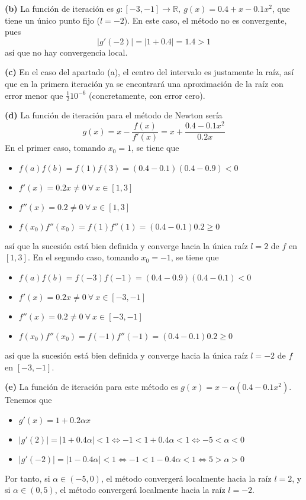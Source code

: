 \documentclass[12pt]{report}
\newcommand{\R}{\mathbb R}
\begin{document}
\vspace{2mm}
\textbf{(b) } La función de iteración es $g \colon [-3,-1] \to \R, \ g(x) = 0.4 + x - 0.1x^2$, que tiene un único punto fijo ($l = -2$). En este caso, el método no es convergente, pues
\[|g'(-2)| = |1+0.4| = 1.4 > 1\]
así que no hay convergencia local.

\vspace{2mm}
\textbf{(c) } En el caso del apartado (a), el centro del intervalo es justamente la raíz, así que en la primera iteración ya se encontrará una aproximación de la raíz con error menor que $\frac{1}{2}10^{-6}$ (concretamente, con error cero).

\vspace{2mm}
\textbf{(d) } La función de iteración para el método de Newton sería
\[g(x) = x - \frac{f(x)}{f'(x)} = x + \frac{0.4-0.1x^2}{0.2x}\]
En el primer caso, tomando $x_0 = 1$, se tiene que
\begin{itemize}
    \item $f(a)f(b) = f(1)f(3) = (0.4-0.1)(0.4-0.9) < 0$
    \item $f'(x) = 0.2x \neq 0 \ \forall \ x \in [1,3]$
    \item $f''(x) = 0.2 \neq 0 \ \forall \ x \in [1,3]$
    \item $f(x_0)f''(x_0) = f(1)f''(1) = (0.4-0.1)0.2 \geq 0$
\end{itemize}
así que la sucesión está bien definida y converge hacia la única raíz $l = 2$ de $f$ en $[1,3]$. En el segundo caso, tomando $x_0 = -1$, se tiene que
\begin{itemize}
    \item $f(a)f(b) = f(-3)f(-1) = (0.4-0.9)(0.4-0.1) < 0$
    \item $f'(x) = 0.2x \neq 0 \ \forall \ x \in [-3,-1]$
    \item $f''(x) = 0.2 \neq 0 \ \forall \ x \in [-3,-1]$
    \item $f(x_0)f''(x_0) = f(-1)f''(-1) = (0.4-0.1)0.2 \geq 0$
\end{itemize}
así que la sucesión está bien definida y converge hacia la única raíz $l = -2$ de $f$ en $[-3,-1]$.

\vspace{2mm}
\textbf{(e) } La función de iteración para este método es $g(x) = x - \alpha(0.4-0.1x^2)$. Tenemos que
\begin{itemize}
    \item $g'(x) = 1 + 0.2\alpha x$
    \item $|g'(2)| = |1+0.4\alpha| < 1 \iff -1 < 1+0.4\alpha < 1 \iff -5 < \alpha < 0$
    \item $|g'(-2)| = |1-0.4\alpha| < 1 \iff -1 < 1-0.4\alpha < 1 \iff 5 > \alpha > 0$
\end{itemize}
Por tanto, si $\alpha \in (-5,0)$, el método convergerá localmente hacia la raíz $l =2$, y si $\alpha \in (0,5)$, el método convergerá localmente hacia la raíz $l = -2$.
\end{document}
